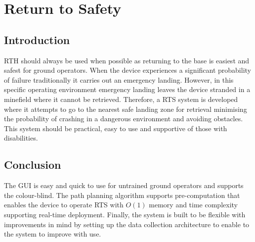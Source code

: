 \newpage
{}
\section{Return to Safety} \label{Return to Safety}

\subsection{Introduction}\label{sub_section:tgt_RTS_intro}
\gls{RTH} should always be used when possible as returning to the base is easiest and safest for ground operators. When the device experiences a significant probability of failure traditionally it carries out an emergency landing. However, in this specific operating environment emergency landing leaves the device stranded in a minefield where it cannot be retrieved. Therefore, a \gls{RTS} system is developed where it attempts to go to the nearest safe landing zone for retrieval minimising the probability of crashing in a dangerous environment and avoiding obstacles. This system should be practical, easy to use and supportive of those with disabilities.





\subsection{Conclusion}
The \gls{GUI} is easy and quick to use for untrained ground operators and supports the colour-blind. The path planning algorithm supports pre-computation that enables the device to operate \gls{RTS} with $O(1)$ memory and time complexity supporting real-time deployment. Finally, the system is built to be flexible with improvements in mind by setting up the data collection architecture to enable to the system to improve with use. 